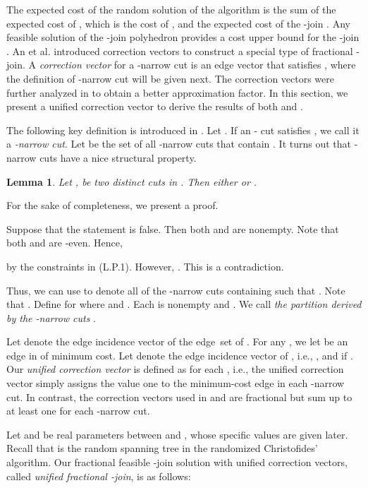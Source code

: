 \documentclass[11pt]{article}
\newcommand{\qed}{\hspace*{\fill}}
\newtheorem{lemma}[theorem]{Lemma}
\newenvironment{proof}[1][Proof. ]{\noindent {\bf #1 }}{\qed}
\begin{document}
The expected cost of the random solution of the algorithm
is the sum of the expected cost of , which is the cost of ,
and the expected cost of the -join .
Any feasible solution of the -join polyhedron provides
a cost upper bound for the -join .
An et al. \cite{AKS12} introduced correction vectors to construct a special type of fractional -join. A \emph{correction vector} for a -narrow cut  is an edge vector  that satisfies , where the definition of -narrow cut will be given next. The correction vectors were further analyzed in \cite{sebo13}
to obtain a better approximation factor. In this section, we present a unified correction vector
to derive the results of both \cite{AKS12} and \cite{sebo13}.

The following key definition is introduced in \cite{AKS12}.
Let . If an - cut  satisfies
, we call it a \emph{-narrow cut}.
Let  be the set of all -narrow cuts
that contain . It turns out that -narrow cuts have
a nice structural property.

\begin{lemma}\cite{AKS12} \label{lem:nestedCuts}
Let ,  be two distinct cuts in .
Then either  or .
\end{lemma}

For the sake of completeness, we present a proof.
\vspace{3mm}

\begin{proof}
Suppose that the statement is false.
Then both  and  are nonempty.
Note that both  and  are
-even. Hence,

by the constraints in (L.P.1).
However, .
This is a contradiction.
\end{proof}

Thus, we can use  to denote all of
the -narrow cuts containing  such that
.
Note that .
Define  for 
where  and .
Each  is nonempty and .
We call  \emph{the partition derived by
the -narrow cuts }.

Let  denote the edge incidence vector of the edge~set of .
For any , we let  be
an edge in  of minimum cost.
Let  denote the edge incidence vector of ,
i.e., , and  if .
Our \emph{unified correction vector} is defined as  for each ,
i.e., the unified correction vector simply assigns
the value one to the minimum-cost edge in each -narrow cut. In contrast, the correction vectors used
in \cite{AKS12} and \cite{sebo13} are fractional but sum up to at least one for each -narrow cut.


Let  and  be real parameters between  and ,
whose specific values are given later.
Recall that  is the random spanning tree in the
randomized Christofides' algorithm. Our fractional feasible -join solution with unified correction
vectors, called \emph{unified fractional -join}, is as follows:
\end{document}
